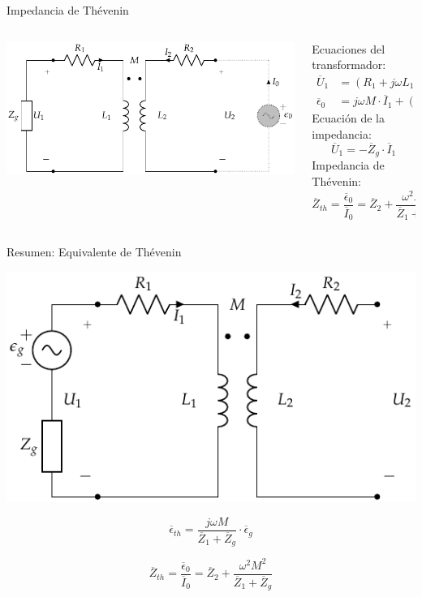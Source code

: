 \documentclass[aspectratio=169, usenames,svgnames,dvipsnames]{beamer}
\begin{document}
\begin{frame}[label={sec:org3f7f192}]{Impedancia de Thévenin}
\begin{columns}
\begin{column}{0.4\columnwidth}
\begin{center}
\includegraphics[width=.9\linewidth]{../figs/Trafo_Real_ImpedanciaPrimario.pdf}
\end{center}
\end{column}
\begin{column}{0.6\columnwidth}
Ecuaciones del transformador:
\begin{align*}
  \overline{U}_1 &= (R_1 + j \omega L_1) \cdot \overline{I}_1 + j \omega M \cdot\overline{I}_0\\
  \overline{\epsilon}_0 &= j \omega M \cdot \overline{I}_1 + (R_2 + j \omega L_2) \cdot \overline{I}_0
\end{align*}
Ecuación de la impedancia:
\[
  \overline{U}_1 = - \overline{Z}_g \cdot \overline{I}_1
\]
Impedancia de Thévenin:
\[
  \boxed{\overline{Z}_{th} = \frac{\overline{\epsilon}_0}{\overline{I}_0} = \overline{Z}_2 + \frac{\omega^2 M^2}{\overline{Z}_1 + \overline{Z}_g}}
\]
\end{column}
\end{columns}
\end{frame}
\begin{frame}[label={sec:org73ab7d9}]{Resumen: Equivalente de Thévenin}
\begin{center}
\includegraphics[height=0.45\textheight]{../figs/Trafo_Real_FuentePrimario.pdf}
\end{center}

\[
  \boxed{\overline{\epsilon}_{th} = \frac{j\omega M}{\overline{Z}_1 + \overline{Z}_g} \cdot \overline{\epsilon}_g}
\]

\[
  \boxed{\overline{Z}_{th} = \frac{\overline{\epsilon}_0}{\overline{I}_0} = \overline{Z}_2 + \frac{\omega^2 M^2}{\overline{Z}_1 + \overline{Z}_g}}
\]
\end{frame}
\end{document}
